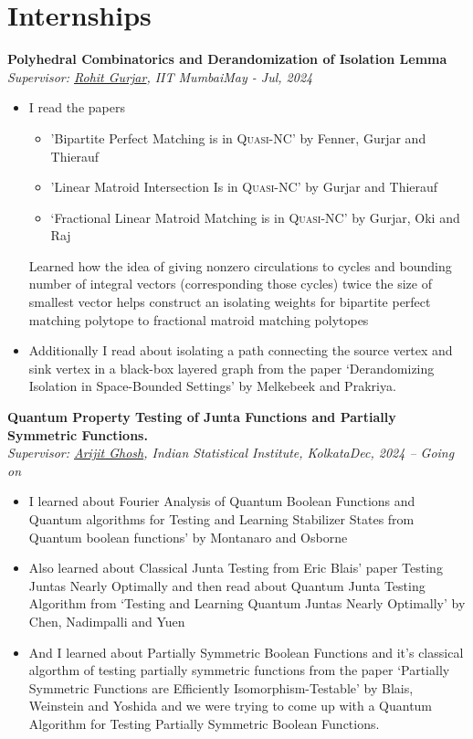 \documentclass[letterpaper,10pt]{article}
\newcommand{\sbt}{\,\begin{picture}(-1,1)(-1,-3)\circle*{3}\end{picture}\ }
\newcommand{\heading}[2]{
  \hspace{0pt}#1\hfill#2\\
}
\newcommand{\headingBf}[2]{
  \heading{\textbf{#1}}{\textbf{#2}}
}
\newcommand{\headingIt}[2]{
  \heading{\textit{#1}}{\textit{#2}}
}
\newenvironment{resume_list}{
  \vspace{-7pt}
  \begin{itemize}[itemsep=-2px, parsep=1pt, leftmargin=30pt, label={$\circ$}]
}{
  \end{itemize}
}
\begin{document}
\section{Internships}
\begin{resume_list}
	\item \headingBf{Polyhedral Combinatorics and Derandomization of Isolation Lemma}{}
	\headingIt{Supervisor: \href{https://www.cse.iitb.ac.in/~rgurjar/}{Rohit Gurjar}, IIT Mumbai}{May - Jul, 2024}
\begin{itemize}
	\item I read the papers\begin{itemize}[label=$\sbt$]
		\item  'Bipartite Perfect Matching is in \textsc{Quasi-NC}' by Fenner, Gurjar and Thierauf
		\item 'Linear Matroid Intersection Is in \textsc{Quasi-NC}' by Gurjar and Thierauf
		\item `Fractional Linear Matroid Matching is in \textsc{Quasi-NC}' by Gurjar, Oki and Raj
	\end{itemize}Learned how the idea of giving nonzero circulations to cycles and bounding number of integral vectors (corresponding those cycles) twice the size of smallest vector helps construct an isolating weights for bipartite perfect matching polytope to fractional matroid matching polytopes
	\item Additionally I read about isolating a path connecting the source vertex and sink vertex in a black-box layered graph from the paper `Derandomizing Isolation in Space-Bounded Settings' by Melkebeek and Prakriya.
\end{itemize}

\item \headingBf{Quantum Property Testing of Junta Functions and Partially Symmetric Functions.}{}
\headingIt{Supervisor: \href{https://sites.google.com/site/homepagearijitghosh/}{Arijit Ghosh}, Indian Statistical Institute, Kolkata}{Dec, 2024 -- Going on}
\begin{itemize}
	\item I learned about Fourier Analysis of Quantum Boolean Functions and Quantum algorithms for Testing and Learning Stabilizer States from Quantum boolean functions' by Montanaro and Osborne 
	\item Also  learned about Classical Junta Testing from Eric Blais' paper Testing Juntas Nearly Optimally and then read about Quantum Junta Testing Algorithm from `Testing and Learning Quantum Juntas Nearly Optimally' by Chen, Nadimpalli and Yuen
	\item And I learned about Partially Symmetric Boolean Functions and it's classical algorthm of testing partially symmetric functions from the paper `Partially Symmetric Functions are Efficiently Isomorphism-Testable' by Blais, Weinstein and Yoshida and we were trying to come up with a Quantum Algorithm for Testing Partially Symmetric Boolean Functions.
\end{itemize}



\end{resume_list}
\end{document}
